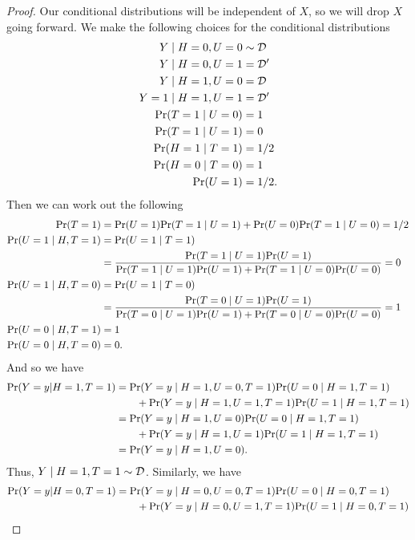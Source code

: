 \begin{proof}
Our conditional distributions will be independent of $X$, so we will drop $X$ going forward. We make the following choices for the conditional distributions
\begin{align*}
Y \mid  H=0, U=0 &\sim \mathcal{D} \\
Y \mid H=0, U=1 &= \mathcal{D}' \\
Y \mid H=1, U=0 &= \mathcal{D} \\
Y=1 \mid H=1, U=1 &= \mathcal{D}' \\
\textnormal{Pr}(T=1 \mid U=0) &= 1 \\ 
\textnormal{Pr}(T = 1 \mid U=1) &= 0 \\ 
\textnormal{Pr}(H=1 \mid T=1) &= 1/2 \\
\textnormal{Pr}(H=0 \mid T=0) &= 1 \\
\textnormal{Pr}(U=1) &= 1/2.
\end{align*}
Then we can work out the following
\begin{align*}
\textnormal{Pr}(T=1) &= \textnormal{Pr}(U=1)\textnormal{Pr}(T = 1 \mid U=1) + \textnormal{Pr}(U=0)\textnormal{Pr}(T = 1 \mid U=0) = 1/2 \\
\textnormal{Pr}(U=1 \mid H, T=1) &= \textnormal{Pr}(U=1 \mid T=1) \\
&= \frac{\textnormal{Pr}(T=1 \mid U=1)\textnormal{Pr}(U=1)}{\textnormal{Pr}(T=1 \mid U=1)\textnormal{Pr}(U=1) + \textnormal{Pr}(T=1 \mid U=0)\textnormal{Pr}(U=0)} = 0 \\
\textnormal{Pr}(U=1 \mid H, T=0) &= \textnormal{Pr}(U=1 \mid T=0) \\
&= \frac{\textnormal{Pr}(T=0 \mid U=1)\textnormal{Pr}(U=1)}{\textnormal{Pr}(T=0 \mid U=1)\textnormal{Pr}(U=1) + \textnormal{Pr}(T=0 \mid U=0)\textnormal{Pr}(U=0)} = 1 \\
\textnormal{Pr}(U=0 \mid H, T=1) &= 1 \\
\textnormal{Pr}(U=0 \mid H, T=0) &= 0.
\end{align*}
And so we have
\begin{align*}
\textnormal{Pr}(Y=y | H=1, T=1) &= \textnormal{Pr}(Y=y \mid H=1, U=0, T=1) \textnormal{Pr}(U=0 \mid H=1, T=1) \\
&\hspace{2em} +  \textnormal{Pr}(Y=y \mid H=1, U=1, T=1) \textnormal{Pr}(U=1 \mid H=1, T=1) \\
&= \textnormal{Pr}(Y=y \mid H=1, U=0) \textnormal{Pr}(U=0 \mid H=1, T=1) \\
&\hspace{2em} +  \textnormal{Pr}(Y=y \mid H=1, U=1) \textnormal{Pr}(U=1 \mid H=1, T=1) \\
&= \textnormal{Pr}(Y=y \mid H=1, U=0).
\end{align*}
Thus, $Y \mid H=1, T=1 \sim \mathcal{D}$. Similarly, we have
\begin{align*}
\pr(Y=y | H=0, T=1) &= \pr(Y=y \mid H=0, U=0, T=1) \pr(U=0 \mid H=0, T=1) \\
&\hspace{2em} +  \pr(Y=y \mid H=0, U=1, T=1) \pr(U=1 \mid H=0, T=1) \\

\end{align*}
\end{proof}
